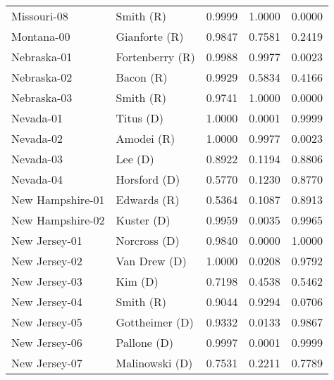 \begin{longtable}{llrll}
       Missouri-08 &             {\color{Red} Smith (R)} &       0.9999 &        1.0000 &        0.0000 \\
        Montana-00 &         {\color{Red} Gianforte (R)} &       0.9847 &        0.7581 &        0.2419 \\
       Nebraska-01 &       {\color{Red} Fortenberry (R)} &       0.9988 &        0.9977 &        0.0023 \\
       Nebraska-02 &             {\color{Red} Bacon (R)} &       0.9929 &        0.5834 &        0.4166 \\
       Nebraska-03 &             {\color{Red} Smith (R)} &       0.9741 &        1.0000 &        0.0000 \\
         Nevada-01 &            {\color{Blue} Titus (D)} &       1.0000 &        0.0001 &        0.9999 \\
         Nevada-02 &            {\color{Red} Amodei (R)} &       1.0000 &        0.9977 &        0.0023 \\
         Nevada-03 &              {\color{Blue} Lee (D)} &       0.8922 &        0.1194 &        0.8806 \\
         Nevada-04 &         {\color{Blue} Horsford (D)} &       0.5770 &        0.1230 &        0.8770 \\
  New Hampshire-01 &           {\color{Red} Edwards (R)} &       0.5364 &        0.1087 &        0.8913 \\
  New Hampshire-02 &           {\color{Blue} Kuster (D)} &       0.9959 &        0.0035 &        0.9965 \\
     New Jersey-01 &         {\color{Blue} Norcross (D)} &       0.9840 &        0.0000 &        1.0000 \\
     New Jersey-02 &         {\color{Blue} Van Drew (D)} &       1.0000 &        0.0208 &        0.9792 \\
     New Jersey-03 &              {\color{Blue} Kim (D)} &       0.7198 &        0.4538 &        0.5462 \\
     New Jersey-04 &             {\color{Red} Smith (R)} &       0.9044 &        0.9294 &        0.0706 \\
     New Jersey-05 &       {\color{Blue} Gottheimer (D)} &       0.9332 &        0.0133 &        0.9867 \\
     New Jersey-06 &          {\color{Blue} Pallone (D)} &       0.9997 &        0.0001 &        0.9999 \\
     New Jersey-07 &       {\color{Blue} Malinowski (D)} &       0.7531 &        0.2211 &        0.7789 \\

\end{longtable}

